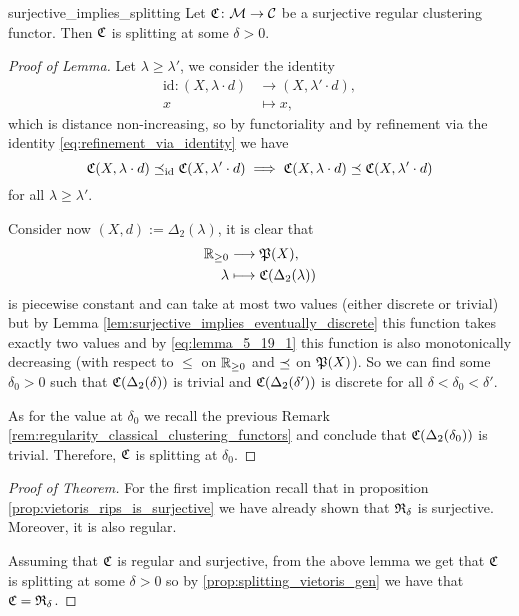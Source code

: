 \begin{lemma}{}{surjective_implies_splitting}
    Let $\Cf\colon \M \to \C$ be a surjective regular clustering functor. Then $\Cf$ is splitting at some $\delta > 0$.
\end{lemma}

\begin{proof}[Proof of Lemma]
    Let $\lambda \ge \lambda'$, we consider the identity
    \begin{align*}
        \mathrm{id}: (X, \lambda \cdot d) &\longrightarrow (X, \lambda' \cdot d),\\
        x &\longmapsto x,
    \end{align*}
    which is distance non-increasing, so by functoriality and by refinement via the identity \eqref{eq:refinement_via_identity} we have
    \begin{equation}
    \label{eq:lemma_5_19_1}
    \Cf(X, \lambda \cdot d) \refines_\mathrm{id} \Cf(X, \lambda' \cdot d) \implies \Cf(X, \lambda \cdot d) \refines \Cf(X, \lambda' \cdot d)
    \end{equation}
    for all $\lambda \ge \lambda'$.

    Consider now $(X,d) := \Delta_2(\lambda)$, it is clear that
    \begin{align*}
        \R_{\geq0} &\longrightarrow \P(X), \\
        \lambda &\longmapsto \Cf(\Delta_2(\lambda))
    \end{align*}
    is piecewise constant and can take at most two values (either discrete or trivial) but by Lemma \ref{lem:surjective_implies_eventually_discrete} this function takes exactly two values and by \eqref{eq:lemma_5_19_1} this function is also monotonically decreasing (with respect to $\le$ on $\R_{\geq0}$ and $\refines$ on $\P(X)$).
    So we can find some $\delta_0 > 0$ such that $\Cf(\Delta_2(\delta))$ is trivial and $\Cf(\Delta_2(\delta'))$ is discrete for all $\delta < \delta_0 < \delta'$.

    As for the value at $\delta_0$ we recall the previous Remark \ref{rem:regularity_classical_clustering_functors} and conclude that $\Cf(\Delta_2(\delta_0))$ is trivial. Therefore, $\Cf$ is splitting at $\delta_0$.
\end{proof}

\begin{proof}[Proof of Theorem]
    For the first implication recall that in proposition \ref{prop:vietoris_rips_is_surjective} we have already shown that $\Rf_\delta$ is surjective. Moreover, it is also regular.

    Assuming that $\Cf$ is regular and surjective, from the above lemma we get that $\Cf$ is splitting at some $\delta > 0$ so by \ref{prop:splitting_vietoris_gen} we have that $\Cf = \Rf_{\delta}$.
\end{proof}

